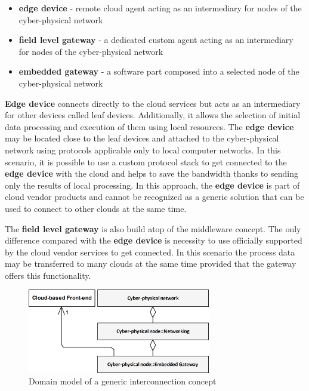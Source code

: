 \documentclass{jacsart}
\begin{document}
\begin{itemize}
      \item \textbf{edge device} - remote cloud agent acting as an intermediary for nodes of the cyber-physical network
      \item \textbf{field level gateway} - a dedicated custom agent acting as an intermediary for nodes of the cyber-physical network
      \item \textbf{embedded gateway} - a software part composed into a selected node of the cyber-physical network
\end{itemize}

\textbf{Edge device} connects directly to the cloud services but acts as an intermediary for other devices called leaf devices. Additionally, it allows the selection of initial data processing and execution of them using local resources. The \textbf{edge device} may be located close to the leaf devices and attached to the cyber-physical network using protocols applicable only to local computer networks. In this scenario, it is possible to use a custom protocol stack to get connected to the \textbf{edge device} with the cloud and helps to save the bandwidth thanks to sending only the results of local processing. In this approach, the \textbf{edge device} is part of cloud vendor products and cannot be recognized as a generic solution that can be used to connect to other clouds at the same time.

The \textbf{field level gateway} is also build atop of the middleware concept. The only difference compared with the \textbf{edge device} is necessity to use officially supported by the cloud vendor services to get connected. In this scenario the process data may be transferred to many clouds at the same time provided that the gateway offers this functionality.

\begin{figure}
      \centering
      \includegraphics[width=8cm]{../.Media/StrategyDomainModel.png}
      \caption{Domain model of a generic interconnection concept}\label{figure1.StrategyDomainModel}
\end{figure}
\end{document}
